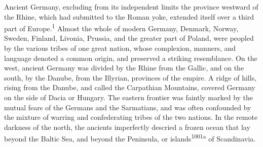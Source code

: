 Ancient Germany, excluding from its independent limits the
province westward of the Rhine, which had submitted to the Roman
yoke, extended itself over a third part of Europe.\textsuperscript{1} Almost the
whole of modern Germany, Denmark, Norway, Sweden, Finland,
Livonia, Prussia, and the greater part of Poland, were peopled by
the various tribes of one great nation, whose complexion,
manners, and language denoted a common origin, and preserved a
striking resemblance. On the west, ancient Germany was divided by
the Rhine from the Gallic, and on the south, by the Danube, from
the Illyrian, provinces of the empire. A ridge of hills, rising
from the Danube, and called the Carpathian Mountains, covered
Germany on the side of Dacia or Hungary. The eastern frontier was
faintly marked by the mutual fears of the Germans and the
Sarmatians, and was often confounded by the mixture of warring
and confederating tribes of the two nations. In the remote
darkness of the north, the ancients imperfectly descried a frozen
ocean that lay beyond the Baltic Sea, and beyond the Peninsula,
or islands\textsuperscript{1001a} of Scandinavia.

